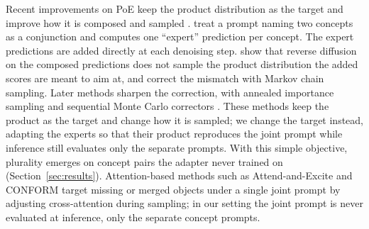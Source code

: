 \documentclass{article} %
\begin{document}
Recent improvements on PoE keep the product distribution as the target and improve how it is composed and sampled \citep{dutta2026steer, huang2026factordiff, wang2026testtime}. \citet{liu2022compositional} treat a prompt naming two concepts as a conjunction and computes one ``expert'' prediction per concept. The expert predictions are added directly at each denoising step. \citet{du2023reduce} show that reverse diffusion on the composed predictions does not sample the product distribution the added scores are meant to aim at, and correct the mismatch with Markov chain sampling. Later methods sharpen the correction, with annealed importance sampling \citep{zhang2025product} and sequential Monte Carlo correctors \citep{skreta2024superdiff, skreta2025feynman}. These methods keep the product as the target and change how it is sampled; we change the target instead, adapting the experts so that their product reproduces the joint prompt while inference still evaluates only the separate prompts. With this simple objective, plurality emerges on concept pairs the adapter never trained on (Section~\ref{sec:results}). Attention-based methods such as Attend-and-Excite \citep{chefer2023attend} and CONFORM \citep{meral2024conform} target missing or merged objects under a single joint prompt by adjusting cross-attention during sampling; in our setting the joint prompt is never evaluated at inference, only the separate concept prompts.



\end{document}
